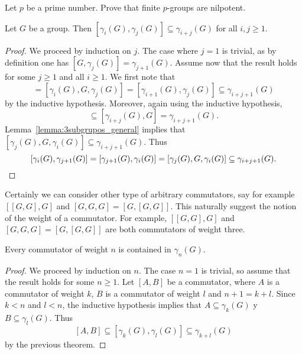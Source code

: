 \begin{exercise}
	Let $p$ be a prime number. Prove that finite $p$-groups are nilpotent. 
\end{exercise}

\begin{theorem}
	\label{theorem:gamma}
	Let $G$ be a group. Then $[\gamma_i(G),\gamma_j(G)]\subseteq
	\gamma_{i+j}(G)$ for all $i,j\geq1$.	
\end{theorem}

\begin{proof}
	We proceed by induction on $j$. The case where $j=1$ is trivial, as by definition one has 
	$[G,\gamma_j(G)]=\gamma_{j+1}(G)$. Assume now that the result holds for 
	some $j\geq1$ and all $i\geq1$. 
	We first note that 	
	\begin{equation*}
		[G,\gamma_i(G),\gamma_j(G)]=[\gamma_i(G),G,\gamma_j(G)]=[\gamma_{i+1}(G),\gamma_j(G)]\subseteq \gamma_{i+j+1}(G)
	\end{equation*}
	by the inductive hypothesis. Moreover, again using the inductive hypothesis,  
	\begin{equation*}
	[\gamma_i(G),\gamma_j(G),G]\subseteq [\gamma_{i+j}(G),G]=\gamma_{i+j+1}(G).
	\end{equation*}
	Lemma~\ref{lemma:3subgrupos_general} implies that 
	$[\gamma_j(G),G,\gamma_i(G)]\subseteq \gamma_{i+j+1}(G)$. Thus  
	\[
	[\gamma_i(G),\gamma_{j+1}(G)]=[\gamma_{j+1}(G),\gamma_i(G)]=[\gamma_j(G),G,\gamma_i(G)]\subseteq \gamma_{i+j+1}(G).\qedhere
	\]
\end{proof}

Certainly we can consider other type of arbitrary commutators, say for example 
$[[G,G],G]$ and $[G,G,G]=[G,[G,G]]$. This naturally suggest the notion of the
weight of a commutator. For example, $[[G,G],G]$ and $[G,G,G]=[G,[G,G]]$ are
both commutators of weight three. 

\begin{corollary}
	Every commutator of weight $n$ is contained in 
	$\gamma_n(G)$.
\end{corollary}

\begin{proof}
	We proceed by induction on $n$. The case $n=1$ is trivial, so assume that
	the result holds for some $n\geq1$.  Let  
	$[A,B]$ be a commutator, where $A$ is a commutator of weight $k$,
	$B$ is a commutator of weight $l$ and $n+1=k+l$. Since $k<n$ and $l<n$, the inductive 
	hypothesis implies that $A\subseteq \gamma_k(G)$ y $B\subseteq
	\gamma_l(G)$. Thus 
	\[
	[A,B]\subseteq [\gamma_k(G),\gamma_l(G)]\subseteq
	\gamma_{k+l}(G)
	\]
	by the previous theorem. 
\end{proof}

